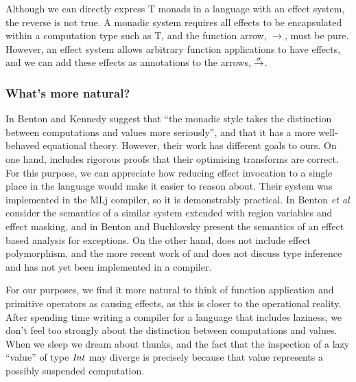 
\vspace{-1ex}

Although we can directly express T monads in a language with an effect system, the reverse is not true. A monadic system requires all effects to be encapsulated within a computation type such as T, and the function arrow, $\to$, must be pure. However, an effect system allows arbitrary function applications to have effects, and we can add these effects as annotations to the arrows, $\stackrel{\sigma}{\rightarrow}$.


\subsubsection{What's more natural?}
In \cite{benton:monads-effects-transformations} Benton and Kennedy suggest that ``the monadic style takes the distinction between computations and values more seriously'', and that it has a more well-behaved equational theory. However, their work has different goals to ours. On one hand, \cite{benton:monads-effects-transformations} includes rigorous proofs that their optimising transforms are correct. For this purpose, we can appreciate how reducing effect invocation to a single place in the language would make it easier to reason about. Their system was implemented in the MLj \cite{benton:mlj}  compiler, so it is demonstrably practical. In \cite{benton:relational-semantics-effect-transformations} Benton \emph{et al} consider the semantics of a similar system extended with region variables and effect masking, and in \cite{benton:semantics-effect-analysis} Benton and Buchlovsky present the semantics of an effect based analysis for exceptions. On the other hand, \cite{benton:mlj} does not include effect polymorphism, and the more recent work of \cite{benton:relational-semantics-effect-transformations} and \cite{benton:semantics-effect-analysis} does not discuss type inference and has not yet been implemented in a compiler.  

For our purposes, we find it more natural to think of function application and primitive operators as causing effects, as this is closer to the operational reality. After spending time writing a compiler for a language that includes laziness, we don't feel too strongly about the distinction between computations and values. When we sleep we dream about thunks, and the fact that the inspection of a lazy ``value'' of type $\operatorname{\mathit{Int}}$ may diverge is precisely because that value represents a possibly suspended computation.  

